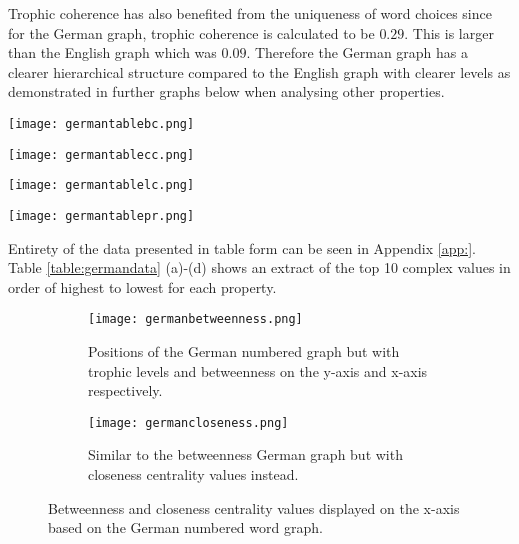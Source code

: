 Trophic coherence has also benefited from the uniqueness of word choices since for the German graph, trophic coherence is calculated to be $0.29$. This is larger than the English graph which was $0.09$. Therefore the German graph has a clearer hierarchical structure compared to the English graph with clearer levels as demonstrated in further graphs below when analysing other properties.

\begin{table}[H]
\centering
\begin{subtable}{.2\textwidth}
	\centering
	\texttt{[image: germantablebc.png]}
	\caption{}
	\label{table:germantablebc}
\end{subtable}
\hfill
\begin{subtable}{.2\textwidth}
	\centering
	\texttt{[image: germantablecc.png]}
	\caption{}
	\label{table:germantablecc}
\end{subtable}
\hfill
\begin{subtable}{.2\textwidth}
	\centering
	\texttt{[image: germantablelc.png]}
	\caption{}
	\label{table:germantablelc}
\end{subtable}
\hfill
\begin{subtable}{.2\textwidth}
	\centering
	\texttt{[image: germantablepr.png]}
	\caption{}
	\label{table:germantablepr}
\end{subtable}
\caption{}
\label{table:germandata}
\end{table}

Entirety of the data presented in table form can be seen in Appendix \ref{app:}. Table \ref{table:germandata} (a)-(d) shows an extract of the top 10 complex values in order of highest to lowest for each property.

\begin{figure}[H]
\centering
\begin{subfigure}{.45\textwidth}
	\hspace{-1cm} 
	\texttt{[image: germanbetweenness.png]}
	\caption{Positions of the German numbered graph but with trophic levels and betweenness on the y-axis and x-axis respectively.}
	\label{fig:gerbc}
\end{subfigure}
\hfill
\begin{subfigure}{.45\textwidth}
	\hspace{-1cm} 
	\texttt{[image: germancloseness.png]}
	\caption{Similar to the betweenness German graph but with closeness centrality values instead. }
	\label{fig:gercc}
\end{subfigure}
\caption{Betweenness and closeness centrality values displayed on the x-axis based on the German numbered word graph.}
\label{fig:gercentrality}
\end{figure}

